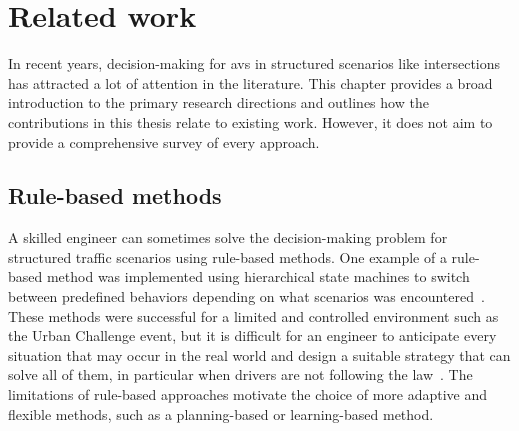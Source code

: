 \chapter{Related work}\label{ch:related_work}
In recent years, decision-making for \gls{av}s in structured scenarios like intersections has attracted a lot of attention in the literature. This chapter provides a broad introduction to the primary research directions and outlines how the contributions in this thesis relate to existing work. However, it does not aim to provide a comprehensive survey of every approach.

\section{Rule-based methods}
A skilled engineer can sometimes solve the decision-making problem for structured traffic scenarios using rule-based methods. One example of a rule-based method was implemented using hierarchical state machines to switch between predefined behaviors depending on what scenarios was encountered~\cite{Fletcher2008, darpa2008}. These methods were successful for a limited and controlled environment such as the Urban Challenge event, but it is difficult for an engineer to anticipate every situation that may occur in the real world and design a suitable strategy that can solve all of them, in particular when drivers are not following the law~\cite{Althoff2021}. The limitations of rule-based approaches motivate the choice of more adaptive and flexible methods, such as a planning-based or learning-based method. 


